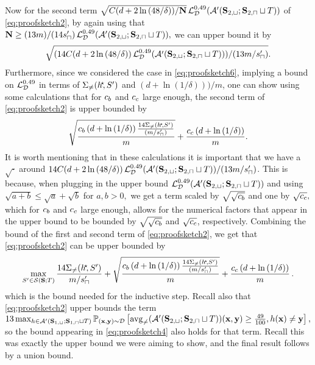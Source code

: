 Now for the second term $ \sqrt{C(d+2\ln{\left(48/\delta \right)})/\mathbf{N}}\operatorname{\mathcal{L}}_{\mathcal{D}}^{0.49}(\mathcal{A}'(\mathbf{S}_{2,\sqcup};\mathbf{S}_{2,\sqcap}\sqcup T)) $ of \cref{eq:proofsketch2}, by again using that $ \mathbf{N}\geq  (13m)/(14s_{\sqcap}')\operatorname{\mathcal{L}}_{\mathcal{D}}^{0.49}(\mathcal{A}'(\mathbf{S}_{2,\sqcup};\mathbf{S}_{2,\sqcap}\sqcup T)),$ we can upper bound it by 
\[ \sqrt{(14C(d+2\ln{\left(48/\delta \right)})\operatorname{\mathcal{L}}_{\mathcal{D}}^{0.49}(\mathcal{A}'(\mathbf{S}_{2,\sqcup};\mathbf{S}_{2,\sqcap}\sqcup T)))/(13m/s_{\sqcap}')}. \]  
Furthermore, since we considered the case in \cref{eq:proofsketch6}, implying a bound on $\operatorname{\mathcal{L}}_{\mathcal{D}}^{0.49}$ in terms of $\Sigma_{\not=}(h^{\negmedspace\star}\negmedspace,S')$ and $\left(d+\ln{(1/\delta )}\right))/m$,
one can show using some calculations that for $ c_b $ and $ c_c $ large enough, the second term of {\cref{eq:proofsketch2}} is upper bounded by 
\[ \sqrt{\frac{c_b\left(d+\ln{(1/\delta )}\right)\frac{14\Sigma_{\not=}(h^{\negmedspace\star}\negmedspace,S')}{(m/s_{\sqcap}')}}{m}}+\frac{c_c\left(d+\ln{(1/\delta )}\right)}{m}. \] 
It is worth mentioning that in these calculations it is important that we have a $ \sqrt{\cdot} $ around $ 14C(d+2\ln{\left(48/\delta \right)})\operatorname{\mathcal{L}}_{\mathcal{D}}^{0.49}(\mathcal{A}'(\mathbf{S}_{2,\sqcup};\mathbf{S}_{2,\sqcap}\sqcup T))/(13m/s_{\sqcap}') $. This is because, when plugging in the upper bound $ \operatorname{\mathcal{L}}_{\mathcal{D}}^{0.49}(\mathcal{A}'(\mathbf{S}_{2,\sqcup};\mathbf{S}_{2,\sqcap}\sqcup T)) $ and using $ \sqrt{a+b}\leq \sqrt{a}+\sqrt{b} $ for $ a,b>0,$ we get a term scaled by $ \sqrt{\sqrt{c_b}} $ and one by $ \sqrt{c_c},$ which for $c_b $ and $ c_c $ large enough, allows for the numerical factors that appear in the upper bound to be bounded by  $ \sqrt{\sqrt{c_b} }$ and $ \sqrt{c_c} $, respectively. 
Combining the bound of the first and second term of \cref{eq:proofsketch2}, we get that \cref{eq:proofsketch2} can be upper bounded by 
\begin{align}\label{eq:proofsketch4}
    \max\limits_{S'\in\mathcal{S}(\mathbf{S};T)}\frac{14\Sigma_{\not=}(h^{\negmedspace\star}\negmedspace,S')}{m/s_{\sqcap}'}+\sqrt{\frac{c_b\left(d+\ln{(1/\delta )}\right)\frac{14\Sigma_{\not=}(h^{\negmedspace\star}\negmedspace,S')}{(m/s_{\sqcap}')}}{m}}+\frac{c_c\left(d+\ln{(1/\delta )}\right)}{m} \,.
\end{align}
which is the bound needed for the inductive step. Recall also that \cref{eq:proofsketch2} upper bounds the term $
    13\max_{h\in\mathcal{A}'(\mathbf{S}_{1,\sqcup};\mathbf{S}_{1,\sqcap}\sqcup T)}\operatorname*{\mathbb{P}}_{(\mathbf{x},\mathbf{y})\sim\mathcal{D}}\left[\operatorname{\mathrm{avg}_{\not=}}(\mathcal{A}'(\mathbf{S}_{2,\sqcup};\mathbf{S}_{2,\sqcap}\sqcup T))(\mathbf{x},\mathbf{y})\geq \frac{49}{100},h(\mathbf{x})\not=\mathbf{y}\right],
$
so the bound appearing in \cref{eq:proofsketch4} also holds for that term. Recall this was exactly the upper bound we were aiming to show, and the final result follows by a union bound.

